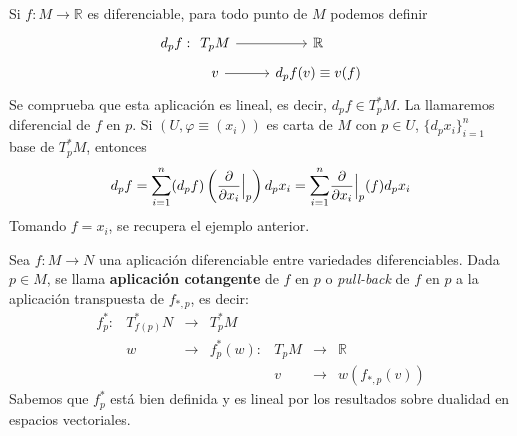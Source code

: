 \begin{ejem}
Si $f:M\to \mathbb{R}$ es diferenciable, para todo punto de $M$ podemos definir $$\begin{tikzcd}
d_pf: \hspace{-9mm} & T_pM \rar & \mathbb{R}\\[-5mm]
& v \rar & d_pf(v) \equiv v(f)
\end{tikzcd}$$
Se comprueba que esta aplicación es lineal, es decir, $d_pf\in T_p^*M$. La llamaremos diferencial de $f$ en $p$. Si $(U, \varphi\equiv(x_i))$ es carta de $M$ con $p \in U$, $\{d_px_i\}_{i=1}^n$ base de $T_p^*M$, entonces $$d_pf=\mathlarger{\sum}_{i=1}^n (d_pf)\left(\frac{\partial}{\partial x_i}\Big|_p\right) d_px_i =\mathlarger{\sum}_{i=1}^n \frac{\partial}{\partial x_i}\Big|_p (f) d_px_i$$
Tomando $f = x_i$, se recupera el ejemplo anterior.
\end{ejem}

\begin{defi}
Sea $f: M \to N$ una aplicación diferenciable entre variedades diferenciables. Dada $p \in M$, se llama \textbf{aplicación cotangente} de $f$ en $p$ o \textit{pull-back} de $f$ en $p$ a la aplicación transpuesta de $f_{*,p}$, es decir:
$$\begin{array}{ccccccc}
  f^*_p : & T^*_{f(p)} N & \longrightarrow & T^*_p M \\
     & w & \longrightarrow & f^*_p(w): & T_pM & \longrightarrow & \mathbb{R}\\
     & & & & v & \longrightarrow & w(f_{*,p}(v))
\end{array}$$
Sabemos que $f^*_p$ está bien definida y es lineal por los resultados sobre dualidad en espacios vectoriales.
\end{defi}

